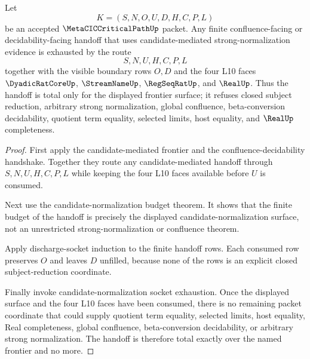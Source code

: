 \begin{theorem}
\label{thm:metacic-critical-path-candidate-mediated-frontier-handoff-totality}
Let
$$
K=(S,N,O,U,D,H,C,P,L)
$$
be an accepted $\MetaCICCriticalPathUp$ packet. Any finite confluence-facing or decidability-facing handoff that uses candidate-mediated strong-normalization evidence is exhausted by the route
$$
S,N,U,H,C,P,L
$$
together with the visible boundary rows $O,D$ and the four L10 faces $\DyadicRatCoreUp$, $\StreamNameUp$, $\RegSeqRatUp$, and $\RealUp$. Thus the handoff is total only for the displayed frontier surface; it refuses closed subject reduction, arbitrary strong normalization, global confluence, beta-conversion decidability, quotient term equality, selected limits, host equality, and $\RealUp$ completeness.
\end{theorem}
\begin{proof}
First apply the candidate-mediated frontier and the confluence-decidability handshake. Together they route any candidate-mediated handoff through $S,N,U,H,C,P,L$ while keeping the four L10 faces available before $U$ is consumed.

Next use the candidate-normalization budget theorem. It shows that the finite budget of the handoff is precisely the displayed candidate-normalization surface, not an unrestricted strong-normalization or confluence theorem.

Apply discharge-socket induction to the finite handoff rows. Each consumed row preserves $O$ and leaves $D$ unfilled, because none of the rows is an explicit closed subject-reduction coordinate.

Finally invoke candidate-normalization socket exhaustion. Once the displayed surface and the four L10 faces have been consumed, there is no remaining packet coordinate that could supply quotient term equality, selected limits, host equality, Real completeness, global confluence, beta-conversion decidability, or arbitrary strong normalization. The handoff is therefore total exactly over the named frontier and no more.
\end{proof}

